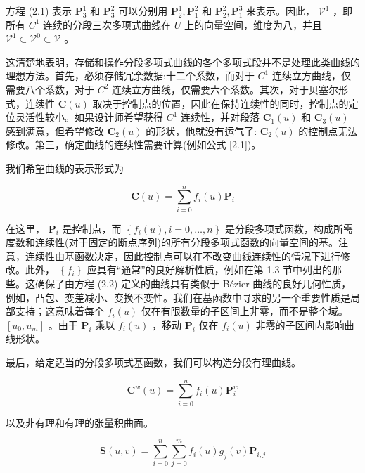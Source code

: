 \documentclass[../main.tex]{subfiles}
\begin{document}
方程 (2.1) 表示 \({\mathbf{P}}_{3}^{1}\) 和 \({\mathbf{P}}_{3}^{2}\) 可以分别用 \({\mathbf{P}}_{2}^{1},{\mathbf{P}}_{1}^{2}\) 和 \({\mathbf{P}}_{2}^{2},{\mathbf{P}}_{1}^{3}\) 来表示。因此， \({\mathcal{V}}^{1}\) ，即所有 \({C}^{1}\) 连续的分段三次多项式曲线在 \(U\) 上的向量空间，维度为八，并且 \({\mathcal{V}}^{1} \subset  {\mathcal{V}}^{0} \subset  \mathcal{V}\) 。

这清楚地表明，存储和操作分段多项式曲线的各个多项式段并不是处理此类曲线的理想方法。首先，必须存储冗余数据:十二个系数，而对于 \({C}^{1}\) 连续立方曲线，仅需要八个系数，对于 \({C}^{2}\) 连续立方曲线，仅需要六个系数。其次，对于贝塞尔形式，连续性 \(\mathbf{C}\left( u\right)\) 取决于控制点的位置，因此在保持连续性的同时，控制点的定位灵活性较小。如果设计师希望获得 \({C}^{1}\) 连续性，并对段落 \({\mathbf{C}}_{1}\left( u\right)\) 和 \({\mathbf{C}}_{3}\left( u\right)\) 感到满意，但希望修改 \({\mathbf{C}}_{2}\left( u\right)\) 的形状，他就没有运气了: \({\mathbf{C}}_{2}\left( u\right)\) 的控制点无法修改。第三，确定曲线的连续性需要计算(例如公式 [2.1])。



我们希望曲线的表示形式为

\[
\mathbf{C}\left( u\right)  = \mathop{\sum }\limits_{{i = 0}}^{n}{f}_{i}\left( u\right) {\mathbf{P}}_{i} \tag{2.2}
\]

在这里， \({\mathbf{P}}_{i}\) 是控制点，而 \(\left\{  {{f}_{i}\left( u\right) ,i = 0,\ldots ,n}\right\}\) 是分段多项式函数，构成所需度数和连续性(对于固定的断点序列)的所有分段多项式函数的向量空间的基。注意，连续性由基函数决定，因此控制点可以在不改变曲线连续性的情况下进行修改。此外， \(\left\{  {f}_{i}\right\}\) 应具有“通常”的良好解析性质，例如在第 1.3 节中列出的那些。这确保了由方程 (2.2) 定义的曲线具有类似于 Bézier 曲线的良好几何性质，例如，凸包、变差减小、变换不变性。我们在基函数中寻求的另一个重要性质是局部支持；这意味着每个 \({f}_{i}\left( u\right)\) 仅在有限数量的子区间上非零，而不是整个域。 \(\left\lbrack  {{u}_{0},{u}_{m}}\right\rbrack\) 。由于 \({\mathbf{P}}_{i}\) 乘以 \({f}_{i}\left( u\right)\) ，移动 \({\mathbf{P}}_{i}\) 仅在 \({f}_{i}\left( u\right)\) 非零的子区间内影响曲线形状。

最后，给定适当的分段多项式基函数，我们可以构造分段有理曲线。

\[
{\mathbf{C}}^{w}\left( u\right)  = \mathop{\sum }\limits_{{i = 0}}^{n}{f}_{i}\left( u\right) {\mathbf{P}}_{i}^{w} \tag{2.3}
\]

以及非有理和有理的张量积曲面。

\[
\mathbf{S}\left( {u,v}\right)  = \mathop{\sum }\limits_{{i = 0}}^{n}\mathop{\sum }\limits_{{j = 0}}^{m}{f}_{i}\left( u\right) {g}_{j}\left( v\right) {\mathbf{P}}_{i,j}
\]
\end{document}
